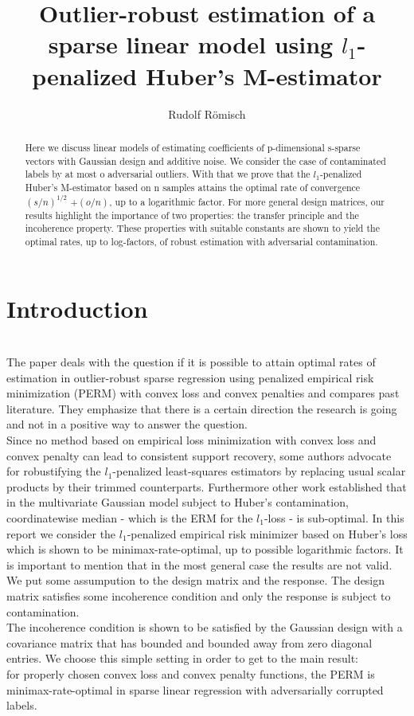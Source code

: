 \documentclass[a4paper,10pt]{article}
\author{Rudolf Römisch}
\title{Outlier-robust estimation of a sparse linear model using $l_1$-penalized Huber's M-estimator}
\theoremstyle{definition}
\begin{document}
\maketitle

\vskip 0.3in

\begin{abstract}
Here we discuss linear models of estimating coefficients of p-dimensional s-sparse vectors with Gaussian design and additive noise. We consider the case of contaminated labels by at most o adversarial outliers. With that we prove that the $l_1$-penalized Huber's M-estimator based on n samples attains the optimal rate of convergence $(s/n)^{1/2}$ +$(o/n)$, up to a logarithmic factor.
For more general design matrices, our results highlight the importance of two properties: the transfer principle and the incoherence property. These properties with suitable constants are shown to yield the optimal rates, up to log-factors, of robust estimation with adversarial contamination.
\end{abstract}


\section{Introduction}\ \\
The paper deals with the question if it is possible to attain optimal rates of estimation in outlier-robust sparse regression using penalized empirical risk minimization (PERM) with convex loss and convex penalties and compares past literature. They emphasize that there is a certain direction the research is going and not in a positive way to answer the question.\\

Since no method based on empirical loss minimization with convex loss and convex penalty can lead to consistent support recovery, some authors advocate for robustifying the $l_1$-penalized least-squares estimators by replacing usual scalar products by their trimmed counterparts.
Furthermore other work established that in the multivariate Gaussian model subject to Huber's contamination, coordinatewise median - which is the ERM for the $l_1$-loss - is sub-optimal.
In this report we consider the $l_1$-penalized empirical risk minimizer based on Huber's loss which is shown to be minimax-rate-optimal, up to possible logarithmic factors.
It is important to mention that in the most general case the results are not valid. We put some assumpution to the design matrix and the response. The design matrix satisfies some incoherence condition and only the response is subject to contamination.\\
The incoherence condition is shown to be satisfied by the Gaussian design with a covariance matrix that has bounded and bounded away from zero diagonal entries.
We choose this simple setting in order to get to the main result:\\
for properly chosen convex loss and convex penalty functions, the PERM is minimax-rate-optimal in sparse linear regression with adversarially corrupted labels.
\end{document}
